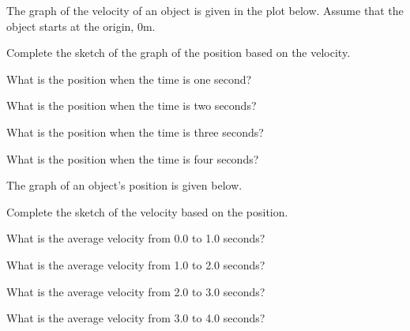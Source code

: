 \begin{problem}
\item The graph of the velocity of an object is given in the plot
  below.  Assume that the object starts at the origin, 0m.

  \begin{subproblem}
  \item Complete the sketch of the graph of the position based on the
    velocity.

    \scalebox{0.8}{}

    \item What is the position when the time is one second?
      \vfill

    \item What is the position when the time is two seconds?
      \vfill

    \item What is the position when the time is three seconds?
      \vfill

    \item What is the position when the time is four seconds?
      \vfill

  \end{subproblem}

  \clearpage

\item The graph of an object's position is given below.

  \begin{subproblem}
  \item Complete the sketch of the velocity based on the position.

    \scalebox{0.8}{}

    \item What is the average velocity from 0.0 to 1.0  seconds?
      \vfill

    \item What is the average velocity from 1.0 to 2.0  seconds?
      \vfill

    \item What is the average velocity from 2.0 to 3.0  seconds?
      \vfill

    \item What is the average velocity from 3.0 to 4.0  seconds?
      \vfill
    \end{subproblem}

    \clearpage


\end{problem}
